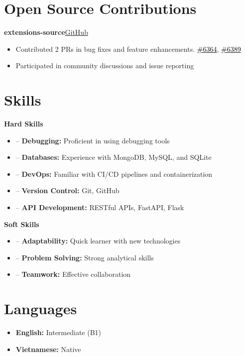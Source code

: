 \documentclass[a4paper,12pt]{article}
\newenvironment{itemList}[3][]
    {
    \noindent\hspace{1em}\textbf{#2}\hfill#3\\[3.75pt]
    \begin{minipage}[t]{\linewidth}
    \begin{itemize}[nosep,after=\strut, leftmargin=2em, itemsep=3pt, label={}, #1]
    }
    {
    \end{itemize}
    \end{minipage}
    }
\begin{document}
\section{Open Source Contributions}
\begin{itemList}{extensions-source}{\href{https://github.com/keiyoushi/extensions-source}{GitHub}}
    \item Contributed 2 PRs in bug fixes and feature enhancements. \hfill {\href{https://github.com/keiyoushi/extensions-source/pull/6364}{\footnotesize\textcolor{black}{\#6364}}}, {\href{https://github.com/keiyoushi/extensions-source/pull/6389}{\footnotesize\textcolor{black}{\#6389}}}
    \item Participated in community discussions and issue reporting
\end{itemList}

\section{Skills}
\begin{itemList}[itemsep=5pt]{Hard Skills}{}
    \item -- \textbf{Debugging:} Proficient in using debugging tools
    \item -- \textbf{Databases:} Experience with MongoDB, MySQL, and SQLite
    \item -- \textbf{DevOps:} Familiar with CI/CD pipelines and containerization
    \item -- \textbf{Version Control:} Git, GitHub
    \item -- \textbf{API Development:} RESTful APIs, FastAPI, Flask
\end{itemList}

\begin{itemList}[itemsep=5pt]{Soft Skills}{}
    \item -- \textbf{Adaptability:} Quick learner with new technologies
    \item -- \textbf{Problem Solving:} Strong analytical skills
    \item -- \textbf{Teamwork:} Effective collaboration
\end{itemList}

\section{Languages}
\begin{itemize}[nosep,after=\strut, leftmargin=1em, itemsep=4pt, label={}]
    \item \textbf{English:} Intermediate (B1)
    \item \textbf{Vietnamese:} Native
\end{itemize}

\vfill
{}
\end{document}
